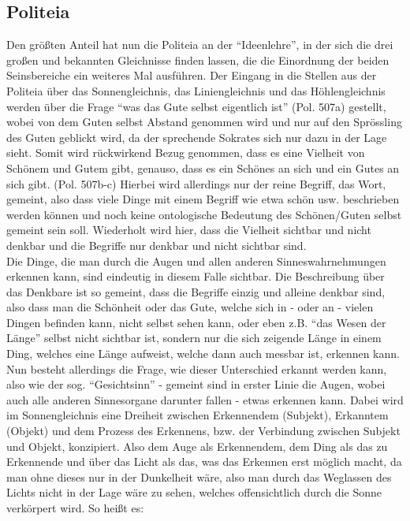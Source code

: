 \subsection{Politeia}
Den größten Anteil hat nun die Politeia an der \enquote{Ideenlehre}, in der sich die drei großen und bekannten Gleichnisse finden lassen, die die Einordnung der beiden Seinsbereiche ein weiteres Mal ausführen.
Der Eingang in die Stellen aus der Politeia über das Sonnengleichnis, das Liniengleichnis und das Höhlengleichnis werden über die Frage \enquote{was das Gute selbst eigentlich ist} (Pol. 507a) gestellt, wobei von dem Guten selbst Abstand genommen wird und nur auf den Sprössling des Guten geblickt wird, da der sprechende Sokrates sich nur dazu in der Lage sieht. Somit wird rückwirkend Bezug genommen, dass es eine Vielheit von Schönem und Gutem gibt, genauso, dass es ein Schönes an sich und ein Gutes an sich gibt. (Pol. 507b-c) Hierbei wird allerdings nur der reine Begriff, das Wort, gemeint, also dass viele Dinge mit einem Begriff wie etwa schön usw. beschrieben werden können und noch keine ontologische Bedeutung des Schönen/Guten selbst gemeint sein soll. 
Wiederholt wird hier, dass die Vielheit sichtbar und nicht denkbar und die Begriffe nur denkbar und nicht sichtbar sind.\\
Die Dinge, die man durch die Augen und allen anderen Sinneswahrnehmungen erkennen kann, sind eindeutig in diesem Falle sichtbar. Die Beschreibung über das Denkbare ist so gemeint, dass die Begriffe einzig und alleine denkbar sind, also dass man die Schönheit oder das Gute, welche sich in - oder an - vielen Dingen befinden kann, nicht selbst sehen kann, oder eben z.B. \enquote{das Wesen der Länge} selbst nicht sichtbar ist, sondern nur die sich zeigende Länge in einem Ding, welches eine Länge aufweist, welche dann auch messbar ist, erkennen kann.
Nun besteht allerdings die Frage, wie dieser Unterschied erkannt werden kann, also wie der sog. \enquote{Gesichtsinn} - gemeint sind in erster Linie die Augen, wobei auch alle anderen Sinnesorgane darunter fallen - etwas erkennen kann.
Dabei wird im Sonnengleichnis eine Dreiheit zwischen Erkennendem (Subjekt), Erkanntem (Objekt) und dem Prozess des Erkennens, bzw. der Verbindung zwischen Subjekt und Objekt, konzipiert. Also dem Auge als Erkennendem, dem Ding als das zu Erkennende und über das Licht als das, was das Erkennen erst möglich macht, da man ohne dieses nur in der Dunkelheit wäre, also man durch das Weglassen des Lichts nicht in der Lage wäre zu sehen, welches offensichtlich durch die Sonne verkörpert wird. So heißt es:
